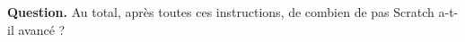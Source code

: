 \documentclass[class=report,crop=false, 12pt]{standalone}
\begin{document}
\begin{enigme}

\bigskip

\textbf{Question.} Au total, après toutes ces instructions, de combien de pas Scratch a-t-il avancé ?



\end{enigme}
\end{document}
